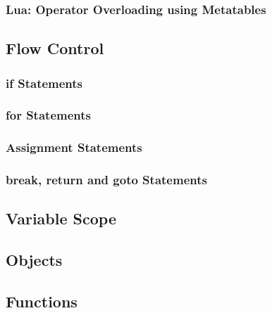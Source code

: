 \subsubsection{Lua: Operator Overloading using Metatables}

\subsection{Flow Control}
\subsubsection{if Statements}
\subsubsection{for Statements}
\subsubsection{Assignment Statements}
\subsubsection{break, return and goto Statements}

\subsection{Variable Scope}

\subsection{Objects}

\subsection{Functions}
